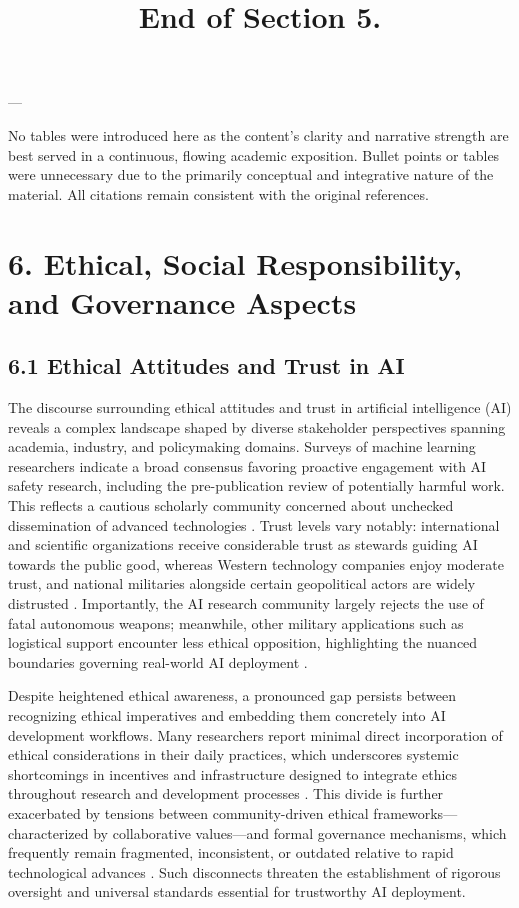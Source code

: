 \documentclass[11pt]{article}
\begin{document}
---

No tables were introduced here as the content’s clarity and narrative strength are best served in a continuous, flowing academic exposition. Bullet points or tables were unnecessary due to the primarily conceptual and integrative nature of the material. All citations remain consistent with the original references.

\title{End of Section 5.}
\maketitle

\section{6. Ethical, Social Responsibility, and Governance Aspects}

\subsection{6.1 Ethical Attitudes and Trust in AI}

The discourse surrounding ethical attitudes and trust in artificial intelligence (AI) reveals a complex landscape shaped by diverse stakeholder perspectives spanning academia, industry, and policymaking domains. Surveys of machine learning researchers indicate a broad consensus favoring proactive engagement with AI safety research, including the pre-publication review of potentially harmful work. This reflects a cautious scholarly community concerned about unchecked dissemination of advanced technologies \cite{ref9}. Trust levels vary notably: international and scientific organizations receive considerable trust as stewards guiding AI towards the public good, whereas Western technology companies enjoy moderate trust, and national militaries alongside certain geopolitical actors are widely distrusted \cite{ref9}. Importantly, the AI research community largely rejects the use of fatal autonomous weapons; meanwhile, other military applications such as logistical support encounter less ethical opposition, highlighting the nuanced boundaries governing real-world AI deployment \cite{ref9}.

Despite heightened ethical awareness, a pronounced gap persists between recognizing ethical imperatives and embedding them concretely into AI development workflows. Many researchers report minimal direct incorporation of ethical considerations in their daily practices, which underscores systemic shortcomings in incentives and infrastructure designed to integrate ethics throughout research and development processes \cite{ref9}. This divide is further exacerbated by tensions between community-driven ethical frameworks—characterized by collaborative values—and formal governance mechanisms, which frequently remain fragmented, inconsistent, or outdated relative to rapid technological advances \cite{ref25,ref36}. Such disconnects threaten the establishment of rigorous oversight and universal standards essential for trustworthy AI deployment.
\end{document}
